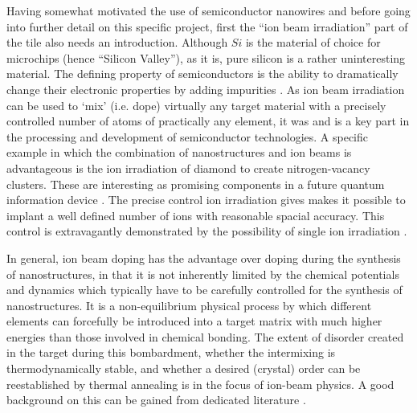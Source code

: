 Having somewhat motivated the use of semiconductor nanowires and before going into further detail on this specific project, first the ``ion beam irradiation'' part of the tile also needs an introduction. Although $Si$ is the material of choice for microchips (hence ``Silicon Valley''), as it is, pure silicon is a rather uninteresting material. The defining property of semiconductors is the ability to dramatically change their electronic properties by adding impurities \cite{sze_physics_2006}. As ion beam irradiation can be used to `mix' (i.e. dope) virtually any target material with a precisely controlled number of atoms of practically any element, it was and is a key part in the processing and development of semiconductor technologies. A specific example in which the combination of nanostructures and ion beams is advantageous is the ion irradiation of diamond to create nitrogen-vacancy clusters. These are interesting as promising components in a future quantum information device \cite{babinec_diamond_2010}. The precise control ion irradiation gives makes it possible to implant a well defined number of ions with reasonable spacial accuracy. This control is extravagantly demonstrated by the possibility of single ion irradiation \cite{meijer_concept_2006,ohdomari_single-ion_2008}. 

In general, ion beam doping has the advantage over doping during the synthesis of nanostructures, in that it is not inherently limited by the chemical potentials and dynamics which typically have to be carefully controlled for the synthesis of nanostructures. It is a non-equilibrium physical process by which different elements can forcefully be introduced into a target matrix with much higher energies than those involved in chemical bonding. The extent of disorder created in the target during this bombardment, whether the intermixing is thermodynamically stable, and whether a desired (crystal) order can be reestablished by thermal annealing is in the focus of ion-beam physics. A good background on this can be gained from dedicated literature \cite{ziegler_stopping_1985,eckstein_computer_1991,nastasi/mayer/hirvonen_ion-solid_2008,schmidt_ion_2012}.

